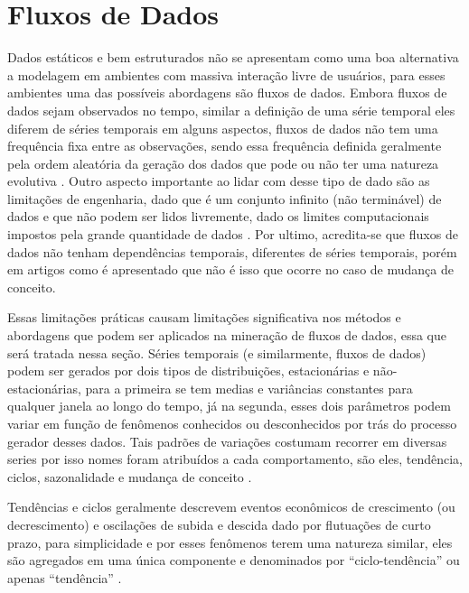 \section{Fluxos de Dados}

\label{sec:datastreams}
Dados estáticos e bem estruturados não se apresentam como uma boa alternativa a
modelagem em ambientes com massiva interação livre de usuários, para esses
ambientes uma das possíveis abordagens são fluxos de
dados\cite{babcock2002models}.
Embora fluxos de dados sejam observados no tempo, similar a definição de uma
série temporal eles diferem de séries temporais em alguns aspectos, fluxos de
dados não tem uma frequência fixa entre as observações, sendo essa frequência
definida geralmente pela ordem aleatória da geração dos dados que pode ou não
ter uma natureza evolutiva  \cite{gama2007learning}. Outro aspecto importante
ao lidar com desse tipo de dado são as limitações de engenharia, dado que é um
conjunto infinito (não terminável) de dados e que não podem ser lidos
livremente, dado os limites computacionais impostos pela grande quantidade de
dados \cite{babcock2002models}. Por ultimo, acredita-se que fluxos de dados não
tenham dependências temporais, diferentes de séries temporais, porém em artigos
como \cite{read2018concept} é apresentado que não é isso que ocorre no caso de
mudança de conceito.

Essas limitações práticas causam limitações significativa nos métodos e
abordagens que podem ser aplicados na mineração de fluxos de dados, essa que
será tratada nessa seção. Séries temporais (e similarmente, fluxos de dados)
podem ser gerados por dois tipos de distribuições, estacionárias e
não-estacionárias, para a primeira se tem medias e variâncias constantes para
qualquer janela ao longo do tempo, já na segunda, esses dois parâmetros podem
variar em função de fenômenos conhecidos ou desconhecidos por trás do processo
gerador desses dados\cite{read2018concept}. Tais padrões de variações costumam
recorrer em diversas series por isso nomes foram atribuídos a cada
comportamento, são eles, tendência, ciclos, sazonalidade e mudança de conceito
\cite{hyndman2018forecasting,tsymbal2004problem,brockwell2016introduction}.

Tendências e ciclos geralmente descrevem eventos econômicos de crescimento (ou
decrescimento) e oscilações de subida e descida dado por flutuações de curto
prazo, para simplicidade e por esses fenômenos terem uma natureza similar, eles
são agregados em uma única componente e denominados por ``ciclo-tendência'' ou
apenas ``tendência'' \cite{hyndman2018forecasting}.

